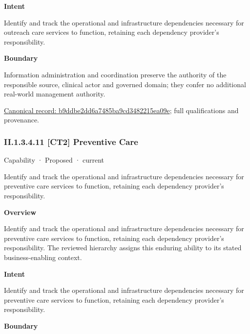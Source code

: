 \textbf{Intent}



Identify and track the operational and infrastructure dependencies necessary for outreach care services to function, retaining each dependency provider's responsibility.



\textbf{Boundary}



Information administration and coordination preserve the authority of the responsible source, clinical actor and governed domain; they confer no additional real-world management authority.


{\footnotesize \href{../../../../continuum/strategy/capability/b9ddbe2dd6a7485ba9cd3482215ea09e.md}{Canonical record: b9ddbe2dd6a7485ba9cd3482215ea09e}; full qualifications and provenance.}\par
\subsubsection*{II.1.3.4.11 [CT2] Preventive Care}
\label{navigation:II.1.3.4.11}

\label{element:dfdc4f0273ba4910848b3b65c9ef6ab2}
{\small Capability · Proposed · current}\par

Identify and track the operational and infrastructure dependencies necessary for preventive care services to function, retaining each dependency provider's responsibility.



\textbf{Overview}



Identify and track the operational and infrastructure dependencies necessary for preventive care services to function, retaining each dependency provider's responsibility. The reviewed hierarchy assigns this enduring ability to its stated business-enabling context.



\textbf{Intent}



Identify and track the operational and infrastructure dependencies necessary for preventive care services to function, retaining each dependency provider's responsibility.



\textbf{Boundary}



